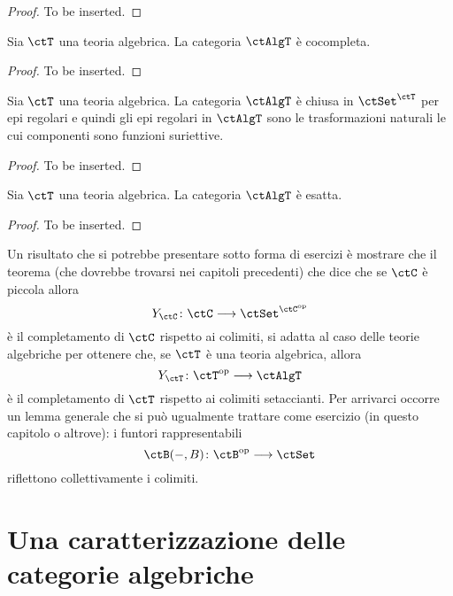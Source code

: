 \begin{proof}
	To be inserted.
\end{proof}

\begin{proposition}\label{prop_AlgT_cocompl}
	Sia \(\ctT\) una teoria algebrica. La categoria \(\ctAlgT\) è cocompleta.
\end{proposition}

\begin{proof}
	To be inserted.
\end{proof}

\begin{corollary}\label{cor_epi_AlgT}
	Sia \(\ctT\) una teoria algebrica. La categoria \(\ctAlgT\) è chiusa in \(\ctSet^{\ctT}\) per epi regolari e quindi gli epi regolari in
	\(\ctAlgT\) sono le trasformazioni naturali le cui componenti sono funzioni suriettive.
\end{corollary}

\begin{proof}
	To be inserted.
\end{proof}

\begin{corollary}\label{cor_AlgT_esatta}
	Sia \(\ctT\) una teoria algebrica. La categoria \(\ctAlgT\) è esatta.
\end{corollary}

\begin{proof}
	To be inserted.
\end{proof}

\begin{warning}\label{caveat_prop_univ_AlgT}
	Un risultato che si potrebbe presentare sotto forma di esercizi è mostrare che il teorema (che dovrebbe trovarsi nei
	capitoli precedenti) che dice che se \(\ctC\) è piccola allora
	\[
		Y_{\ctC} \colon \ctC \fun \ctSet^{\ctC^{\mathrm{op}}}
	\]
	è il completamento di \(\ctC\) rispetto ai colimiti, si adatta al caso delle teorie algebriche per ottenere che, se \(\ctT\)
	è una teoria algebrica, allora
	\[
		Y_{\ctT} \colon \ctT^{\mathrm{op}} \fun \ctAlgT
	\]
	è il completamento di \(\ctT\) rispetto ai colimiti setaccianti. Per arrivarci occorre un lemma generale che si può
	ugualmente trattare come esercizio (in questo capitolo o altrove): i funtori rappresentabili
	\[
		\ctB(-,B) \colon \ctB^{\mathrm{op}} \fun \ctSet
	\]
	riflettono collettivamente i colimiti.
\end{warning}

\section{Una caratterizzazione delle categorie algebriche}\label{sec_caract_AlgT}

